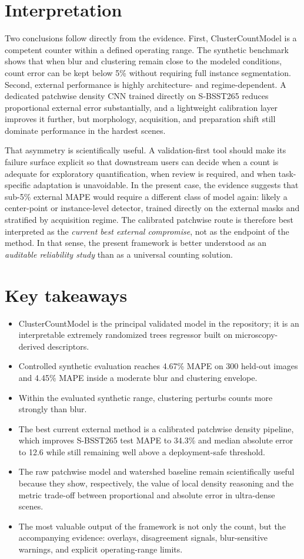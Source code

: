 \documentclass[10pt,a4paper,twocolumn]{article}
\begin{document}
\section{Interpretation}
Two conclusions follow directly from the evidence. First, ClusterCountModel is a competent counter within a defined operating range. The synthetic benchmark shows that when blur and clustering remain close to the modeled conditions, count error can be kept below 5\% without requiring full instance segmentation. Second, external performance is highly architecture- and regime-dependent. A dedicated patchwise density CNN trained directly on S-BSST265 reduces proportional external error substantially, and a lightweight calibration layer improves it further, but morphology, acquisition, and preparation shift still dominate performance in the hardest scenes.

That asymmetry is scientifically useful. A validation-first tool should make its failure surface explicit so that downstream users can decide when a count is adequate for exploratory quantification, when review is required, and when task-specific adaptation is unavoidable. In the present case, the evidence suggests that sub-5\% external MAPE would require a different class of model again: likely a center-point or instance-level detector, trained directly on the external masks and stratified by acquisition regime. The calibrated patchwise route is therefore best interpreted as the \emph{current best external compromise}, not as the endpoint of the method. In that sense, the present framework is better understood as an \emph{auditable reliability study} than as a universal counting solution.

\section{Key takeaways}
\begin{itemize}
\item ClusterCountModel is the principal validated model in the repository; it is an interpretable extremely randomized trees regressor built on microscopy-derived descriptors.
\item Controlled synthetic evaluation reaches 4.67\% MAPE on 300 held-out images and 4.45\% MAPE inside a moderate blur and clustering envelope.
\item Within the evaluated synthetic range, clustering perturbs counts more strongly than blur.
\item The best current external method is a calibrated patchwise density pipeline, which improves S-BSST265 test MAPE to 34.3\% and median absolute error to 12.6 while still remaining well above a deployment-safe threshold.
\item The raw patchwise model and watershed baseline remain scientifically useful because they show, respectively, the value of local density reasoning and the metric trade-off between proportional and absolute error in ultra-dense scenes.
\item The most valuable output of the framework is not only the count, but the accompanying evidence: overlays, disagreement signals, blur-sensitive warnings, and explicit operating-range limits.
\end{itemize}
\end{document}

